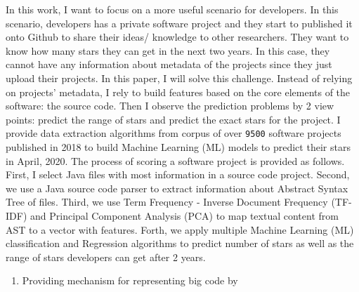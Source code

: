 In this work, I want to focus on a more useful scenario for developers. In this scenario, developers has a private software project and they start to published it onto Github to share their ideas/ knowledge to other researchers. They want to know how many stars they can get in the next two years. In this case, they cannot have any information about metadata of the projects since they just upload their projects. In this paper, I will solve this challenge. Instead of relying on projects' metadata, I rely to build features based on the core elements of the software: the source code. Then I observe the prediction problems by 2 view points: predict the range of stars and predict the exact stars for the project. I provide data extraction algorithms from corpus of over \texttt{9500} software projects published in 2018 to build Machine Learning (ML) models to predict their stars in April, 2020. 
The process of scoring a software project is provided as follows. First, I select Java files with most information in a source code project. Second, we use a Java source code parser to extract information about Abstract Syntax Tree of files. Third, we use Term Frequency - Inverse Document Frequency (TF-IDF) and Principal Component Analysis (PCA) to map textual content from AST to a vector with features. Forth, we apply multiple Machine Learning (ML) classification and Regression algorithms to predict number of stars as well as the range of stars developers can get after 2 years.    
\begin{enumerate}
    \item Providing mechanism for representing big code by 
\end{enumerate}


